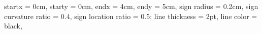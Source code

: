 startx = 0cm,
starty = 0cm,
endx = 4cm,
endy = 5cm,
sign radius = 0.2cm,
sign curvature ratio = 0.4,
sign location ratio = 0.5;
line thickness = 2pt,
line color = black,